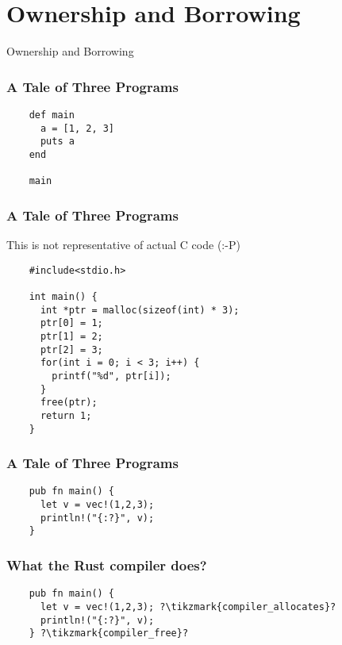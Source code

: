 \section{Ownership and Borrowing}
\label{sec:ownership-borrowing}

\begin{frame}
  \centerline{
    \huge{Ownership and Borrowing}
  }
\end{frame}

\begin{frame}[fragile]
  \frametitle{A Tale of Three Programs}
  \begin{verbatim}
    def main
      a = [1, 2, 3]
      puts a
    end

    main
  \end{verbatim}
\end{frame}

\begin{frame}[fragile]
  \frametitle{A Tale of Three Programs}
  This is not representative of actual C code (:-P)
  \begin{verbatim}
    #include<stdio.h>

    int main() {
      int *ptr = malloc(sizeof(int) * 3);
      ptr[0] = 1;
      ptr[1] = 2;
      ptr[2] = 3;
      for(int i = 0; i < 3; i++) {
        printf("%d", ptr[i]);
      }
      free(ptr);
      return 1;
    }
  \end{verbatim}
\end{frame}

\begin{frame}[fragile]
  \frametitle{A Tale of Three Programs}
  \begin{verbatim}
    pub fn main() {
      let v = vec!(1,2,3);
      println!("{:?}", v);
    }
  \end{verbatim}
\end{frame}

\begin{frame}[fragile]
  \frametitle{What the Rust compiler does?}
  \begin{verbatim}
    pub fn main() {
      let v = vec!(1,2,3); ?\tikzmark{compiler_allocates}?
      println!("{:?}", v);
    } ?\tikzmark{compiler_free}?
  \end{verbatim}
\end{frame}


